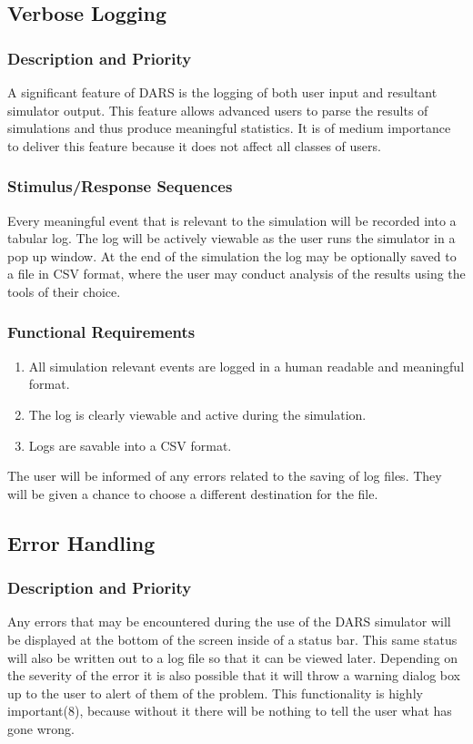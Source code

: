 \documentclass[a4paper,11pt,titlepage]{article}
\begin{document}
\subsection{Verbose Logging}
\subsubsection{Description and Priority}
A significant feature of DARS is the logging of both user input and resultant simulator
output. This feature allows advanced users to parse the results of simulations and
thus produce meaningful statistics. It is of medium importance to deliver this feature
because it does not affect all classes of users.
\subsubsection{Stimulus/Response Sequences}
Every meaningful event that is relevant to the simulation will be recorded into a
tabular log. The log will be actively viewable as the user runs the simulator in a pop
up window. At the end of the simulation the log may be optionally saved to a file in
CSV format, where the user may conduct analysis of the results using the tools of their
choice.
\subsubsection{Functional Requirements}
\begin{enumerate}[{\bf {REQ} 1}]
  \item All simulation relevant events are logged in a human readable and meaningful format.
  \item The log is clearly viewable and active during the simulation.
  \item Logs are savable into a CSV format.
\end{enumerate}

\begin{description}[\breaklabel]
  \item[Errors] The user will be informed of any errors related to the saving of log files.
  They will be given a chance to choose a different destination for the file.
\end{description}

\subsection{Error Handling}
\subsubsection{Description and Priority}
Any errors that may be encountered during the use of the DARS simulator will be
displayed at the bottom of the screen inside of a status bar. This same status will also
be written out to a log file so that it can be viewed later. Depending on the severity
of the error it is also possible that it will throw a warning dialog box up to the user to
alert of them of the problem. This functionality is highly important(8), because without it
there will be nothing to tell the user what has gone wrong.
\end{document}
